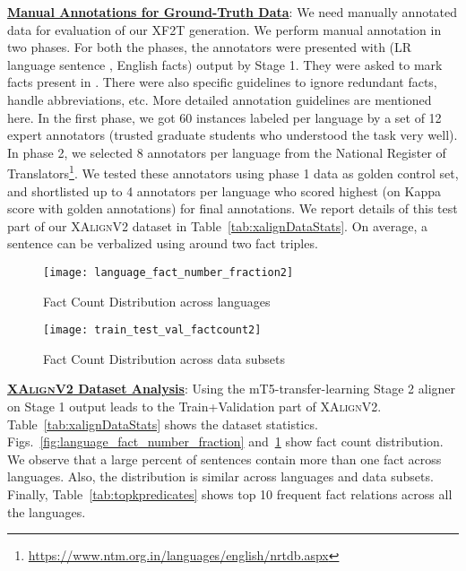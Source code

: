 \documentclass[runningheads]{llncs}
\newcommand{\data}{\textsc{XAlignV2}}
\begin{document}
\noindent\underline{\textbf{Manual Annotations for Ground-Truth Data}}:
We need manually annotated data for evaluation of our XF2T generation. We perform manual annotation in two phases. For both the phases, the annotators were presented with (LR language sentence ,  English facts) output by Stage 1. They were asked to mark facts present in . There were also specific guidelines to ignore redundant facts, handle abbreviations, etc. More detailed annotation guidelines are mentioned here.
In the first phase, we got 60 instances labeled per language by a set of 12 expert annotators (trusted graduate students who understood the task very well). In phase 2, we selected 8 annotators per language from the National Register of Translators\footnote{\url{https://www.ntm.org.in/languages/english/nrtdb.aspx}}. We tested these annotators using phase 1 data as golden control set, and  shortlisted up to 4 annotators per language who scored highest (on Kappa score with golden annotations) for final annotations. We report details of this test part of our \textsc{XAlignV2} dataset in Table~\ref{tab:xalignDataStats}. On average, a sentence can be verbalized using around two fact triples.

\begin{figure}[!t]
\begin{minipage}{0.48\columnwidth}
    \centering
    \texttt{[image: language\_fact\_number\_fraction2]}
    \caption{Fact Count Distribution across languages}
    \label{fig:language_fact_number_fraction}
    \end{minipage}
    \hspace{0.05\columnwidth}
    \begin{minipage}{0.46\columnwidth}
    \centering
    \texttt{[image: train\_test\_val\_factcount2]}
    \caption{Fact Count Distribution across data subsets}
    \label{fig:train_test_val_factcount}
    \end{minipage}
\end{figure}

\noindent\underline{\textbf{\data{} Dataset Analysis}}: 
Using the mT5-transfer-learning Stage 2 aligner on Stage 1 output leads to the Train+Validation part of \data{}. Table~\ref{tab:xalignDataStats} shows the dataset statistics. Figs.~\ref{fig:language_fact_number_fraction} and~\ref{fig:train_test_val_factcount}  show fact count distribution. We observe that a large percent of sentences contain more than one fact across languages. Also, the distribution is similar across languages and data subsets.
Finally, Table~\ref{tab:topkpredicates} shows top 10 frequent fact relations across all the languages. 
\end{document}
